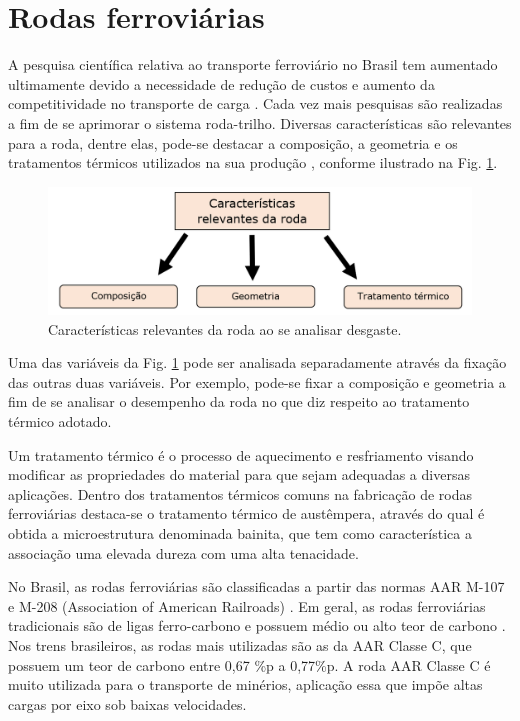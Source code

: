 \documentclass[
12pt,
openany, %
oneside, %
a4paper,			
english,			
brazil			        %
]{abntbibufjf}
\begin{document}
	\pagebreak
	\section{Rodas ferroviárias}
	
	A pesquisa científica relativa ao transporte ferroviário no Brasil tem aumentado ultimamente devido a necessidade de redução de custos e aumento da competitividade no transporte de carga \cite{chaves2017rodas}. Cada vez mais pesquisas são realizadas a fim de se aprimorar o sistema roda-trilho. Diversas características são relevantes para a roda, dentre elas, pode-se destacar a composição, a geometria e os tratamentos térmicos utilizados na sua produção \cite{alves2000desgaste}, conforme ilustrado na Fig. \ref{fig:caracteristicas_roda}.
	
	\begin{figure}[H]
		\centering
		\includegraphics[width=1\textwidth]{caracteristicas_roda}
		\caption{Características relevantes da roda ao se analisar desgaste.}
		\label{fig:caracteristicas_roda}
	\end{figure}

	Uma das variáveis da Fig. \ref{fig:caracteristicas_roda} pode ser analisada separadamente através da fixação das outras duas variáveis. Por exemplo, pode-se fixar a composição e geometria a fim de se analisar o desempenho da roda no que diz respeito ao tratamento térmico adotado. 
	
	Um tratamento térmico é o processo de aquecimento e resfriamento visando modificar as propriedades do material para que sejam adequadas a diversas aplicações. Dentro dos tratamentos térmicos comuns na fabricação de rodas ferroviárias destaca-se o tratamento térmico de austêmpera, através do qual é obtida a microestrutura denominada bainita, que tem como característica a associação uma elevada dureza com uma alta tenacidade.
	
	No Brasil, as rodas ferroviárias são classificadas a partir das normas AAR M-107 e M-208 (Association of American Railroads) \cite{chaves2017rodas}. Em geral, as rodas ferroviárias tradicionais são de ligas ferro-carbono e possuem médio ou alto teor de carbono \cite{chaves2017rodas}. Nos trens brasileiros, as rodas mais utilizadas são as da AAR Classe C, que possuem um teor de carbono entre 0,67 \%p a 0,77\%p. A roda AAR Classe C é muito utilizada para o transporte de minérios, aplicação essa que impõe altas cargas por eixo sob baixas velocidades.
	
\end{document}
